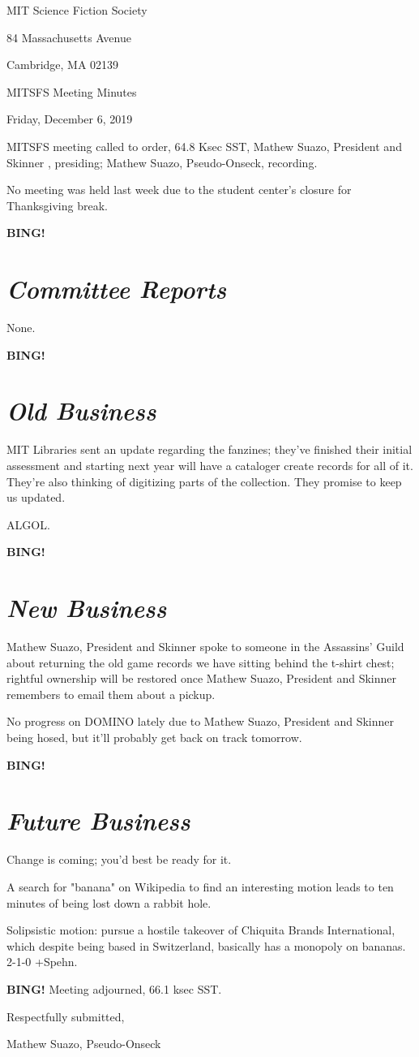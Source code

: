 \documentclass[10pt]{article}
\newcommand{\bing}{{\bf BING!} }
\newcommand{\goto}[1]{\bing \vskip 12pt \section*{{\em{#1}}}}
\newcommand{\skinner}{Mathew Suazo, President and Skinner }
\newcommand{\onseck}{Mathew Suazo, Pseudo-Onseck}
\newcommand{\meetingdate}{Friday, December 6, 2019 }
\begin{document}
\begin{center}

MIT Science Fiction Society

84 Massachusetts Avenue

Cambridge, MA 02139

\vspace{12pt}

MITSFS Meeting Minutes

\meetingdate

\end{center}

\vspace{18pt}

\setlength{\parskip}{6pt}

\noindent
MITSFS meeting called to order, 64.8 Ksec SST,
\skinner, presiding; \onseck, recording.

No meeting was held last week due to the student center's closure for Thanksgiving break.

\goto{Committee Reports}

None.

\goto{Old Business}

MIT Libraries sent an update regarding the fanzines; they've finished their initial assessment and starting next year will have a cataloger create records for all of it. They're also thinking of digitizing parts of the collection. They promise to keep us updated.

ALGOL.

\goto{New Business}

\skinner spoke to someone in the Assassins' Guild about returning the old game records we have sitting behind the t-shirt chest; rightful ownership will be restored once \skinner remembers to email them about a pickup.

No progress on DOMINO lately due to \skinner being hosed, but it'll probably get back on track tomorrow.

\goto{Future Business}

Change is coming; you'd best be ready for it.

A search for "banana" on Wikipedia to find an interesting motion leads to ten minutes of being lost down a rabbit hole.

Solipsistic motion: pursue a hostile takeover of Chiquita Brands International, which despite being based in Switzerland, basically has a monopoly on bananas. 2-1-0 +Spehn.

\bing
\noindent
Meeting adjourned, 66.1 ksec SST.

\vspace{18pt}

\centerline{Respectfully submitted,}
\centerline{\onseck}
\end{document}
